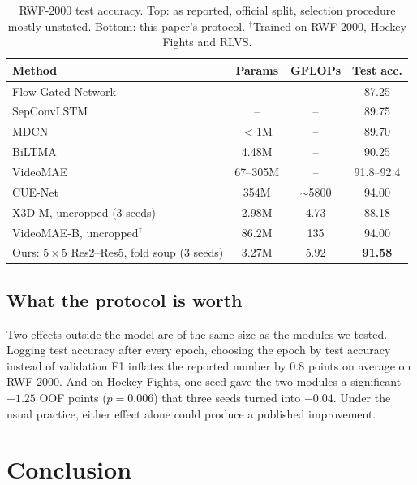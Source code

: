 \documentclass[runningheads]{llncs}
\begin{document}
\begin{table}[t]
\centering
\caption{RWF-2000 test accuracy. Top: as reported, official split,
selection procedure mostly unstated. Bottom: this paper's protocol.
$^\dagger$Trained on RWF-2000, Hockey Fights and RLVS.}
\label{tab:compare}
\setlength{\tabcolsep}{5pt}
\begin{tabular}{lccc}
\toprule
Method & Params & GFLOPs & Test acc. \\
\midrule
Flow Gated Network~\cite{rwf2000}   & --    & --   & 87.25 \\
SepConvLSTM~\cite{sepconvlstm}      & --    & --   & 89.75 \\
MDCN~\cite{mdcn}                    & $<$1M & --   & 89.70 \\
BiLTMA~\cite{biltma}                & 4.48M & --   & 90.25 \\
VideoMAE~\cite{videomae,mixvit}     & 67--305M & -- & 91.8--92.4 \\
CUE-Net~\cite{cuenet}               & 354M  & $\sim$5800 & 94.00 \\
\midrule
X3D-M, uncropped (3 seeds)          & 2.98M & 4.73 & 88.18 \\
VideoMAE-B, uncropped$^\dagger$     & 86.2M & 135  & 94.00 \\
Ours: $5\times5$ Res2--Res5, fold soup (3 seeds) & 3.27M & 5.92 & \textbf{91.58} \\
\bottomrule
\end{tabular}
\end{table}

\subsection{What the protocol is worth}
\label{sec:protocol-worth}

Two effects outside the model are of the same size as the modules we
tested. Logging test accuracy after every epoch, choosing the epoch by test
accuracy instead of validation F1 inflates the reported number by 0.8
points on average on RWF-2000. And on Hockey Fights, one seed gave the two
modules a significant $+1.25$ OOF points ($p=0.006$) that three seeds
turned into $-0.04$. Under the usual practice, either effect alone could produce a
published improvement.

\section{Conclusion}
\end{document}
